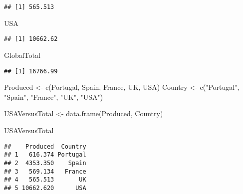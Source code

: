 \documentclass[
]{article}
\newenvironment{Shaded}{\begin{snugshade}}{\end{snugshade}}
\newcommand{\FunctionTok}[1]{\textcolor[rgb]{0.00,0.00,0.00}{#1}}
\newcommand{\NormalTok}[1]{#1}
\newcommand{\OtherTok}[1]{\textcolor[rgb]{0.56,0.35,0.01}{#1}}
\newcommand{\StringTok}[1]{\textcolor[rgb]{0.31,0.60,0.02}{#1}}
\begin{document}
\begin{verbatim}
## [1] 565.513
\end{verbatim}

\begin{Shaded}
\begin{Highlighting}[]
\NormalTok{USA}
\end{Highlighting}
\end{Shaded}

\begin{verbatim}
## [1] 10662.62
\end{verbatim}

\begin{Shaded}
\begin{Highlighting}[]
\NormalTok{GlobalTotal}
\end{Highlighting}
\end{Shaded}

\begin{verbatim}
## [1] 16766.99
\end{verbatim}

\begin{Shaded}
\begin{Highlighting}[]
\NormalTok{Produced }\OtherTok{\textless{}{-}} \FunctionTok{c}\NormalTok{(Portugal, Spain, France, UK, USA)}
\NormalTok{Country }\OtherTok{\textless{}{-}} \FunctionTok{c}\NormalTok{(}\StringTok{"Portugal"}\NormalTok{, }\StringTok{"Spain"}\NormalTok{, }\StringTok{"France"}\NormalTok{, }\StringTok{"UK"}\NormalTok{, }\StringTok{"USA"}\NormalTok{)}

\NormalTok{USAVersusTotal }\OtherTok{\textless{}{-}} \FunctionTok{data.frame}\NormalTok{(Produced, Country)}

\NormalTok{USAVersusTotal}
\end{Highlighting}
\end{Shaded}

\begin{verbatim}
##    Produced  Country
## 1   616.374 Portugal
## 2  4353.350    Spain
## 3   569.134   France
## 4   565.513       UK
## 5 10662.620      USA
\end{verbatim}
\end{document}

